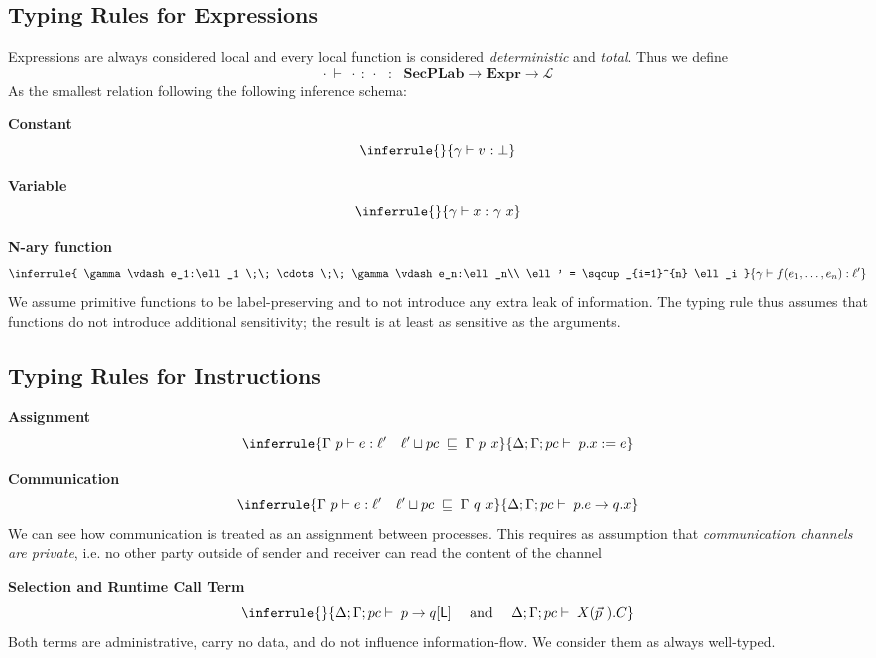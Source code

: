 \documentclass[12pt,a4paper,twoside]{book}
\newcommand{\MCL}{\mathscr{L}}
\begin{document}
\subsection{Typing Rules for Expressions}\label{typ_def:expr}
Expressions are always considered local and every local function is considered \textit{deterministic} and \textit{total}. Thus we define
$$ \cdot ~\vdash~ \cdot~:~\cdot ~~~:~~~ \textbf{SecPLab} \rightarrow \textbf{Expr} \rightarrow \MCL $$
As the smallest relation following the following inference schema:

\medskip
\noindent\textbf{Constant}
\[
  \inferrule{}
  {\gamma \vdash v : \bot}
\]

\medskip
\noindent\textbf{Variable}
\[
  \inferrule{}
  {\gamma \vdash x : \gamma~x}
\]

\medskip
\noindent\textbf{N-ary function}
\[
\inferrule{
  \gamma\vdash e_1:\ell_1 \;\; \cdots \;\; \gamma\vdash e_n:\ell_n\\
  \ell' = \sqcup_{i=1}^{n} \ell_i
}{
  \gamma\vdash f(e_1,\dots,e_n):\ell'
}
\]
We assume primitive functions to be label-preserving and to not introduce any extra leak of information.
The typing rule thus assumes that functions do not introduce additional sensitivity; the result is at least as sensitive as the arguments.

\subsection{Typing Rules for Instructions}
\medskip
\noindent\textbf{Assignment}
\[
  \inferrule
  {\Gamma~p \vdash e : \ell' \quad \ell' \sqcup pc \;\sqsubseteq\; \Gamma~p~x}
  {\Delta;\Gamma;pc \vdash \; p.x := e}
\]

\medskip
\noindent\textbf{Communication}
\[
  \inferrule
  {\Gamma~p \vdash e : \ell' \quad \ell' \sqcup pc \;\sqsubseteq\; \Gamma~q~x}
  {\Delta;\Gamma;pc \vdash \; p.e \to q.x}
\]
We can see how communication is treated as an assignment between processes. This requires as assumption that \textit{communication channels are private}, i.e. no other party outside of sender and receiver can read the content of the channel

\medskip
\noindent\textbf{Selection and Runtime Call Term}
\[
	\inferrule{}{
	\Delta;\Gamma;pc \vdash \; p \to q[\mathsf{L}]
    \quad\text{ and }\quad
    \Delta;\Gamma;pc \vdash \; X(\vec{p}~).C
  }
\]
Both terms are administrative, carry no data, and do not influence information-flow. We consider them as always well-typed.
\end{document}
